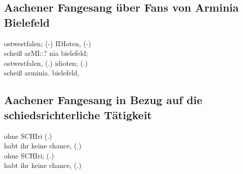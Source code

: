 \subsection{Aachener Fangesang über Fans von Arminia Bielefeld}
\label{subsec:bielefeld}
\begin{dialogue}
	 ostwestfalen; (-) IDIoten, (-) \\
	scheiß arMI::? nia bielefeld; \\
	ostwestfalen, (.) idioten; (.) \\
	scheiß arminia. bielefeld,
\end{dialogue}

\subsection{Aachener Fangesang in Bezug auf die schiedsrichterliche Tätigkeit}
\label{subsec:referee}
\begin{dialogue}
	 ohne SCHIri (.) \\
	habt ihr keine chance, (.) \\
	ohne SCHIri; (.) \\
	habt ihr keine chance, (.)
\end{dialogue}
